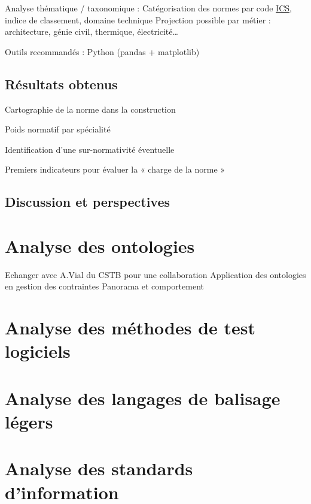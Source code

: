 \documentclass[a4paper,12pt]{article}
\begin{document}
Analyse thématique / taxonomique :
    Catégorisation des normes par code \protect\hyperlink{gls-5}{\label{gls-5-use-3}ICS}, indice de classement, domaine technique
    Projection possible par métier : architecture, génie civil, thermique, électricité…

Outils recommandés : Python (pandas + matplotlib)
\subsection{Résultats obtenus}
\label{sec:org825c82f}
Cartographie de la norme dans la construction

Poids normatif par spécialité

Identification d’une sur-normativité éventuelle

Premiers indicateurs pour évaluer la « charge de la norme »
\subsection{Discussion et perspectives}
\label{sec:org5db63a7}
\clearpage
\section{Analyse des ontologies}
\label{sec:org9763387}
Echanger avec A.Vial du CSTB pour une collaboration
Application des ontologies en gestion des contraintes
Panorama et comportement
\section{Analyse des méthodes de test logiciels}
\label{sec:orgd3fc4fd}
\section{Analyse des langages de balisage légers}
\label{sec:org5c93923}
\section{Analyse des standards d'information}
\label{sec:org9a1092e}
\clearpage
\end{document}

